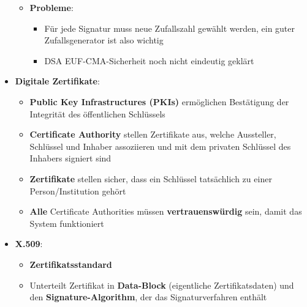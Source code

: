 \begin{itemize}
\begin{itemize}
		\item \textbf{Probleme}:
		\begin{itemize}
			\item Für jede Signatur muss neue Zufallszahl gewählt werden, ein guter Zufallsgenerator ist also wichtig
			\item DSA EUF-CMA-Sicherheit noch nicht eindeutig geklärt
		\end{itemize}
	\end{itemize}
	\item \textbf{Digitale Zertifikate}:
	\begin{itemize}
		\item \textbf{Public Key Infrastructures (PKIs)} ermöglichen Bestätigung der Integrität des öffentlichen Schlüssels
		\item \textbf{Certificate Authority} stellen Zertifikate aus, welche Aussteller, Schlüssel und Inhaber assoziieren und mit dem privaten Schlüssel des Inhabers signiert sind
		\item \textbf{Zertifikate} stellen sicher, dass ein Schlüssel tatsächlich zu einer Person/Institution gehört
		\item \textbf{Alle} Certificate Authorities müssen \textbf{vertrauenswürdig} sein, damit das System funktioniert
	\end{itemize}
	\item \textbf{X.509}:
	\begin{itemize}
		\item \textbf{Zertifikatsstandard}
		\item Unterteilt Zertifikat in \textbf{Data-Block} (eigentliche Zertifikatsdaten) und den \textbf{Signature-Algorithm}, der das Signaturverfahren enthält
	\end{itemize}
\end{itemize}
